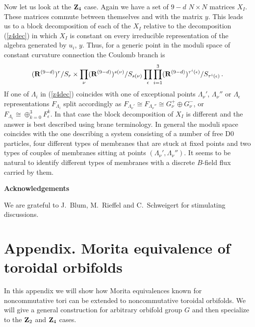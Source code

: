 \documentclass[a4paper,a4paper]{article}
\begin{document}
{Now let us look at the ${\bf Z}_{4}$ case. Again we have a set of $9-d$ $N\times N$ matrices $X_{I}$. These matrices 
commute between themselves and with  the  matrix $y$. 
This leads us to a block decomposition of each of the $X_{I}$ relative to the decomposition (\ref{z4dec}) in which $X_{I}$ is 
constant on every irreducible representation of the algebra generated by $u_{i}$, $y$. 
Thus, for a generic point in the moduli space of constant curvature connection the Coulomb branch is 
$$
({\bf R}^{(9-d)})^{r}/S_{r}\times \prod_{\nu}({\bf R}^{(9-d)})^{s(\nu)}/S_{s(\nu)}
\prod_{\epsilon}\prod_{i=1}^{3}({\bf R}^{(9-d)})^{\tau^{i}(\epsilon)}/S_{\tau^{i}(\epsilon)} \, . 
$$  
If one of $\Lambda_{i}$ in (\ref{z4dec}) coincides with one of exceptional points $\Lambda_{\nu}'$, $\Lambda_{\nu}''$ or 
$\Lambda_{\epsilon}$ representations $F_{\Lambda_{i}}$ split accordingly as 
$F_{\Lambda_{\nu}'} \cong F_{\Lambda_{\nu}''} \cong G^{+}_{\nu} \oplus G^{-}_{\nu}$, or  
$F_{\Lambda_{\epsilon}} \cong \oplus_{k=0}^{3} F_{\epsilon}^{k}$. In that case the block decomposition of $X_{I}$ 
is  different and the answer is best described using  brane terminology. 
In general the moduli space coincides with the one describing  a system consisting of a number of free D0 particles, 
four different types of membranes that are stuck at fixed points and two types of couples of membranes sitting at points 
$(\Lambda_{\nu}', \Lambda_{\nu}'')$. It seems to be natural to identify different types of membranes  with a 
discrete $B$-field flux carried by them.  \\
\begin{center} {\bf Acknowledgements} 
\end{center}
We are grateful to J.~Blum, M.~Rieffel  and C.~Schweigert for stimulating discussions. 
\appendix
\section*{Appendix. Morita equivalence of toroidal orbifolds}

In this appendix we will show how Morita equivalences known for noncommutative tori can be extended to noncommutative 
toroidal orbifolds. We will give a general construction for arbitrary orbifold group $G$ and then specialize to the 
${\bf Z}_{2}$ and ${\bf Z}_{4}$ cases. 


}
\end{document}
